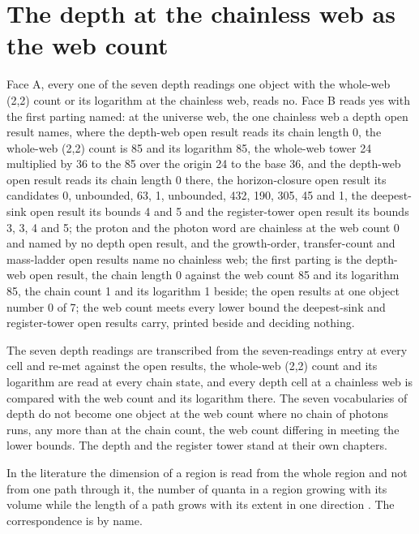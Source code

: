 \section{The depth at the chainless web as the web count}\label{mod:X-4-D544119-w-pwcd}
\begin{chwall}\label{box:X-4-D544119-w-pwcd:1}
Face A, every one of the seven depth readings one object with the whole-web (2,2) count or its logarithm at the chainless web, reads no. Face B reads yes with the first parting named: at the universe web, the one chainless web a depth open result names, where the depth-web open result reads its chain length 0, the whole-web (2,2) count is 85 and its logarithm 85, the whole-web tower 24 multiplied by 36 to the 85 over the origin 24 to the base 36, and the depth-web open result reads its chain length 0 there, the horizon-closure open result its candidates 0, unbounded, 63, 1, unbounded, 432, 190, 305, 45 and 1, the deepest-sink open result its bounds 4 and 5 and the register-tower open result its bounds 3, 3, 4 and 5; the proton and the photon word are chainless at the web count 0 and named by no depth open result, and the growth-order, transfer-count and mass-ladder open results name no chainless web; the first parting is the depth-web open result, the chain length 0 against the web count 85 and its logarithm 85, the chain count 1 and its logarithm 1 beside; the open results at one object number 0 of 7; the web count meets every lower bound the deepest-sink and register-tower open results carry, printed beside and deciding nothing.
\end{chwall}
The seven depth readings are transcribed from the seven-readings entry at every cell and re-met against the open results, the whole-web (2,2) count and its logarithm are read at every chain state, and every depth cell at a chainless web is compared with the web count and its logarithm there. The seven vocabularies of depth do not become one object at the web count where no chain of photons runs, any more than at the chain count, the web count differing in meeting the lower bounds. The depth and the register tower stand at their own chapters.
\begin{chbridge}
In the literature the dimension of a region is read from the whole region and not from one path through it, the number of quanta in a region growing with its volume while the length of a path grows with its extent in one direction \cite{Wald1984,Chung1997}. The correspondence is by name.
\end{chbridge}
